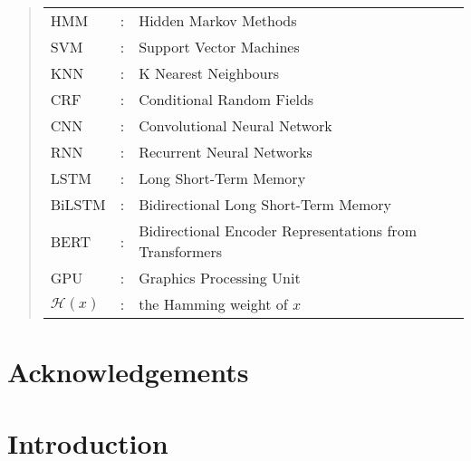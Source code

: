 \documentclass[ %
                    author={Louis Wang},
                supervisor={Dr. Qiang Liu},
                    degree={MSc},
                     title={Identification of Suicide Ideation in Texts},
                      type={},
                      year={2024}]{dissertation}
\begin{document}
\begin{quote}
\noindent
\begin{tabular}{lcl}
HMM &: & Hidden Markov Methods \\
SVM &: & Support Vector Machines \\
KNN &: & K Nearest Neighbours \\
CRF &: & Conditional Random Fields \\
CNN &: & Convolutional Neural Network \\
RNN &: & Recurrent Neural Networks \\
LSTM &: & Long Short-Term Memory \\
BiLSTM &: & Bidirectional Long Short-Term Memory \\
BERT &: & Bidirectional Encoder Representations from Transformers \\
GPU &: & Graphics Processing Unit \\
${\mathcal H}( x )$ &: & the Hamming weight of $x$ \\
\end{tabular}
\end{quote}


\chapter*{Acknowledgements}

\noindent


%

\mainmatter


\chapter{Introduction}
\label{chap:introduction}
\end{document}

